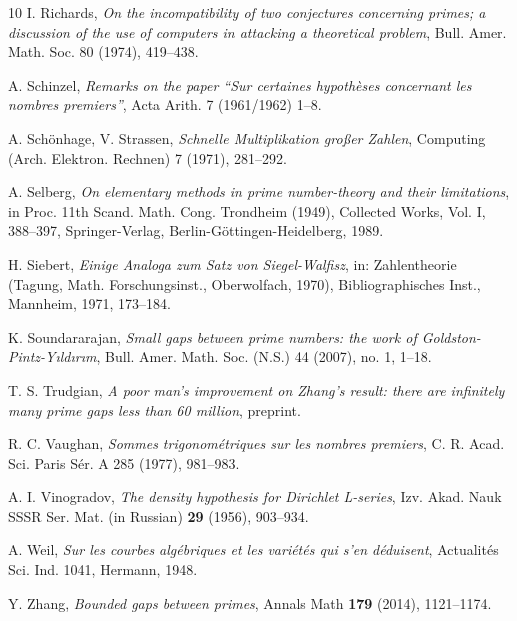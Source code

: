 \begin{thebibliography}{10}
 I. Richards, \emph{On the incompatibility of two
    conjectures concerning primes; a discussion of the use of
    computers in attacking a theoretical problem},
  Bull. Amer. Math. Soc. 80 (1974), 419--438.

 A. Schinzel, \emph{Remarks on the paper ``Sur
    certaines hypoth\`eses concernant les nombres premiers''}, Acta
  Arith. 7 (1961/1962) 1--8.

 A. Sch\"{o}nhage, V. Strassen, \emph{Schnelle
    {M}ultiplikation gro\ss{}er {Z}ahlen}, Computing
  (Arch. Elektron. Rechnen) 7 (1971), 281--292.

 A. Selberg, \emph{On elementary methods in prime
    number-theory and their limitations}, in Proc. 11th
  Scand. Math. Cong. Trondheim (1949), Collected Works, Vol. I,
  388--397, Springer-Verlag, Berlin-G\"ottingen-Heidelberg, 1989.

 H. Siebert, \emph{Einige Analoga zum Satz von
    Siegel-Walfisz}, in: Zahlentheorie (Tagung, Math. Forschungsinst.,
  Oberwolfach, 1970), Bibliographisches Inst., Mannheim, 1971,
  173--184.

 K. Soundararajan, \emph{Small gaps between prime
    numbers: the work of Goldston-Pintz-Y{\i}ld{\i}r{\i}m},
  Bull. Amer. Math. Soc. (N.S.) 44 (2007), no. 1, 1--18.

 T. S. Trudgian, \emph{A poor man's improvement on
    Zhang's result: there are infinitely many prime gaps less than 60
    million}, preprint.

 R. C. Vaughan, \emph{Sommes trigonom\'etriques sur
    les nombres premiers}, C. R. Acad. Sci. Paris S\'er. A 285 (1977),
  981--983.

A. I. Vinogradov, \emph{The density hypothesis for Dirichlet L-series}, Izv. Akad. Nauk SSSR Ser. Mat. (in Russian) \textbf{29} (1956), 903--934.


 A. Weil, \emph{Sur les courbes alg\'ebriques et les
    vari\'et\'es qui s'en d\'eduisent}, Actualit\'es Sci. Ind. 1041,
  Hermann, 1948.

 Y. Zhang, \emph{Bounded gaps between primes}, Annals Math \textbf{179} (2014), 1121--1174.

\end{thebibliography}



